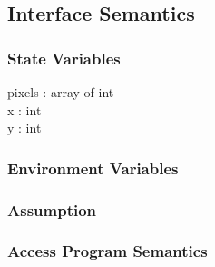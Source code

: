 \documentclass[12pt, letterpaper]{article}
\begin{document}
	\subsection{Interface Semantics}
	
	\subsubsection{State Variables}
	
	pixels : array of int \\
	x : int \\
	y : int \\
	
	\subsubsection{Environment Variables}
	
	\subsubsection{Assumption}
	
	\subsubsection{Access Program Semantics}
	
\end{document}

